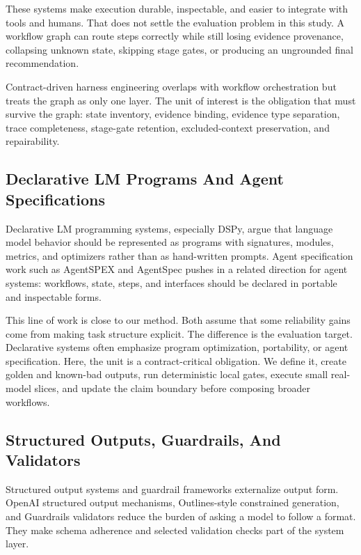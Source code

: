 \documentclass[11pt]{article}
\begin{document}
These systems make execution durable, inspectable, and easier to integrate with tools and humans. That does not settle the evaluation problem in this study. A workflow graph can route steps correctly while still losing evidence provenance, collapsing unknown state, skipping stage gates, or producing an ungrounded final recommendation.

Contract-driven harness engineering overlaps with workflow orchestration but treats the graph as only one layer. The unit of interest is the obligation that must survive the graph: state inventory, evidence binding, evidence type separation, trace completeness, stage-gate retention, excluded-context preservation, and repairability.

\subsection{Declarative LM Programs And Agent Specifications}

Declarative LM programming systems, especially DSPy, argue that language model behavior should be represented as programs with signatures, modules, metrics, and optimizers rather than as hand-written prompts. Agent specification work such as AgentSPEX and AgentSpec pushes in a related direction for agent systems: workflows, state, steps, and interfaces should be declared in portable and inspectable forms. \cite{P2_EXT_DSPY,P2_EXT_AGENTSPEX,P2_EXT_AGENTSPEC}

This line of work is close to our method. Both assume that some reliability gains come from making task structure explicit. The difference is the evaluation target. Declarative systems often emphasize program optimization, portability, or agent specification. Here, the unit is a contract-critical obligation. We define it, create golden and known-bad outputs, run deterministic local gates, execute small real-model slices, and update the claim boundary before composing broader workflows.

\subsection{Structured Outputs, Guardrails, And Validators}

Structured output systems and guardrail frameworks externalize output form. OpenAI structured output mechanisms, Outlines-style constrained generation, and Guardrails validators reduce the burden of asking a model to follow a format. They make schema adherence and selected validation checks part of the system layer. \cite{P2_EXT_OPENAI_STRUCTURED_OUTPUTS,P2_EXT_OUTLINES,P2_EXT_GUARDRAILS}
\end{document}
